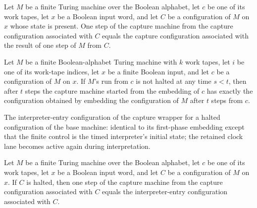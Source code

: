 \begin{lemma}
\label{Turing.timedCapture_step}
\leanok
{}
Let $M$ be a finite Turing machine over the Boolean alphabet, let $c$ be one of its work
tapes, let $x$ be a Boolean input word, and let $C$ be a configuration of $M$ on $x$
whose state is present. One step of the capture machine from the capture configuration
associated with $C$ equals the capture configuration associated with the result of one
step of $M$ from $C$.
\end{lemma}

\begin{lemma}
\label{Turing.timedCapture_run}
\leanok
{}
Let $M$ be a finite Boolean-alphabet Turing machine with $k$ work tapes, let $i$ be one
of its work-tape indices, let $x$ be a finite Boolean input, and let $c$ be a
configuration of $M$ on $x$. If $M$'s run from $c$ is not halted at any time $s<t$, then
after $t$ steps the capture machine started from the embedding of $c$ has exactly the
configuration obtained by embedding the configuration of $M$ after $t$ steps from $c$.
\end{lemma}

\begin{definition}
\label{Turing.timedCapturedCfg}
\leanok
{}
The interpreter-entry configuration of the capture wrapper for a halted
configuration of the base machine: identical to its first-phase embedding
except that the finite control is the timed interpreter's initial state; the
retained clock lane becomes active again during interpretation.
\end{definition}

\begin{lemma}
\label{Turing.timedCapture_transfer}
\leanok
{}
Let $M$ be a finite Turing machine over the Boolean alphabet, let $c$ be one of its work
tapes, let $x$ be a Boolean input word, and let $C$ be a configuration of $M$ on $x$. If
$C$ is halted, then one step of the capture machine from the capture configuration
associated with $C$ equals the interpreter-entry configuration associated with $C$.
\end{lemma}

